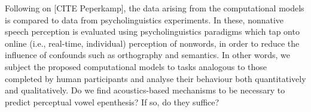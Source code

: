 Following on [CITE Peperkamp], the data arising from the computational models is compared to data from psycholinguistics experiments. In these, nonnative speech perception is evaluated using psycholinguistics paradigms which tap onto online (i.e., real-time, individual) perception of nonwords, in order to reduce the influence of confounds such as orthography and semantics.
In other words, we subject the proposed computational models to tasks analogous to those completed by human participants and analyse their behaviour both quantitatively and qualitatively. Do we find acoustics-based mechanisms to be necessary to predict perceptual vowel epenthesis? If so, do they suffice?




